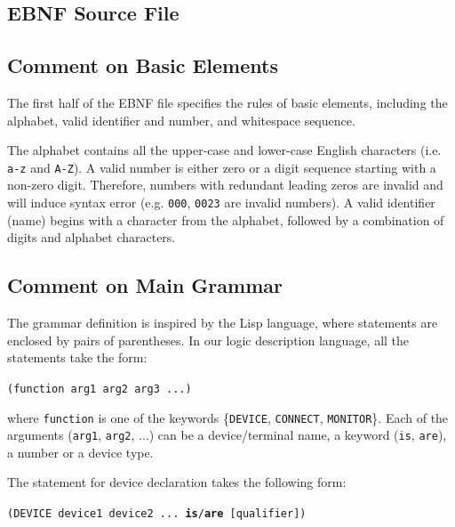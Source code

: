 \documentclass[12pt]{article}
\def\n{\noindent}
\begin{document}
\subsection{EBNF Source File}



\subsection{Comment on Basic Elements}

The first half of the EBNF file specifies the rules of basic elements, including the
alphabet, valid identifier and number, and whitespace sequence.

\vspace{0.3cm}

\n The alphabet contains all the upper-case and lower-case English characters
(i.e. \texttt{a-z} and \texttt{A-Z}). A valid number is either zero or a digit
sequence starting with a non-zero digit. Therefore, numbers with redundant leading
zeros are invalid and will induce syntax error (e.g. \texttt{000}, \texttt{0023}
are invalid numbers). A valid identifier (name) begins with a character from the
alphabet, followed by a combination of digits and alphabet characters.

\subsection{Comment on Main Grammar}

The grammar definition is inspired by the Lisp language, where statements are
enclosed by pairs of parentheses. In our logic description language, all the
statements take the form:

\vspace{0.5cm}
\texttt{(function arg1 arg2 arg3 ...)}
\vspace{0.5cm}

\n where \texttt{function} is one of the keywords \{\texttt{DEVICE},
\texttt{CONNECT}, \texttt{MONITOR}\}. Each of the arguments (\texttt{arg1},
\texttt{arg2}, ...) can be a device/terminal name, a keyword (\texttt{is},
\texttt{are}), a number or a device type. \vspace{0.3cm}

\n The statement for device declaration takes the following form:

\vspace{0.5cm} \texttt{(DEVICE device1 device2 ... \textbf{is}/\textbf{are}
   [qualifier])} \vspace{0.5cm}
\end{document}
